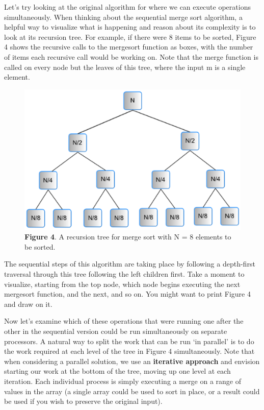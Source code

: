 \documentclass[letterpaper,10pt,openany,oneside]{sphinxmanual}
\begin{document}
Let’s try looking at the original algorithm for where we can execute operations simultaneously.  When thinking about the sequential merge sort algorithm, a helpful way to visualize what is happening and reason about its complexity is to look at its recursion tree.  For example, if there were 8 items to be sorted, Figure 4 shows the recursive calls to the mergesort function  as boxes, with the number of items each recursive call would be working on.  Note that the merge function is called on every node but the leaves of this tree, where the input m is a single element.
\begin{figure}[htbp]
\centering
\capstart

\includegraphics{Figure4.png}
\caption{\textbf{Figure 4}. A recursion tree for merge sort with N = 8 elements to be sorted.}\end{figure}

The sequential steps of this algorithm are taking place by following a depth-first traversal through this tree following the left children first. Take a moment to visualize, starting from the top node, which node begins executing the next mergesort function, and the next, and so on.  You might want to print Figure 4 and draw on it.

Now let’s examine which of these operations that were running one after the other in the sequential version could be run simultaneously on separate processors.  A natural way to split the work that can be run ‘in parallel’ is to do the work required at each level of the tree in Figure 4 simultaneously. Note that when considering a parallel solution, we use an \textbf{iterative approach} and envision starting our work at the bottom of the tree, moving up one level at each iteration. Each individual process is simply executing a merge on a range of values in the array (a single array could be used to sort in place, or a result could be used if you wish to preserve the original input).
\end{document}
